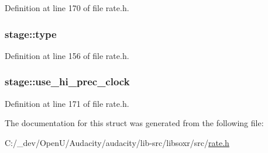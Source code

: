 Definition at line 170 of file rate.\+h.

\subsubsection[{\texorpdfstring{type}{type}}]{ stage\+::type}\hypertarget{structstage_a4b8533d9285ccfa210c90d6c5c755d04}{}\label{structstage_a4b8533d9285ccfa210c90d6c5c755d04}


Definition at line 156 of file rate.\+h.

\subsubsection[{\texorpdfstring{use\+\_\+hi\+\_\+prec\+\_\+clock}{use_hi_prec_clock}}]{ stage\+::use\+\_\+hi\+\_\+prec\+\_\+clock}\hypertarget{structstage_a055cf3bb2bc06f93608c55a2e62cac08}{}\label{structstage_a055cf3bb2bc06f93608c55a2e62cac08}


Definition at line 171 of file rate.\+h.



The documentation for this struct was generated from the following file\+:\begin{DoxyCompactItemize}
\item 
C\+:/\+\_\+dev/\+Open\+U/\+Audacity/audacity/lib-\/src/libsoxr/src/\hyperlink{rate_8h}{rate.\+h}\end{DoxyCompactItemize}

